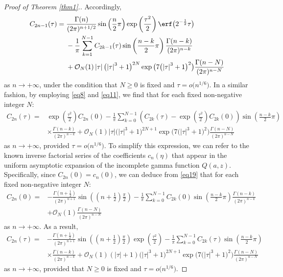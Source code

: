 \begin{proof}[Proof of Theorem \ref{thm1}.]
Accordingly,
\begin{align}
C_{2n - 1} (\tau ) ={}& \frac{\Gamma (n)}{(2\pi )^{n + 1/2} }\sin \left( \frac{n}{2}\pi \right)\exp \left( \frac{\tau ^2}{2} \right)\erf\big( 2^{ - \frac{1}{2}} \tau \big)\nonumber\\
& - \frac{1}{\pi}\sum_{k = 1}^{N - 1} C_{2k - 1} (\tau )\sin \left( \frac{n - k}{2}\pi \right)\frac{\Gamma (n - k)}{(2\pi )^{n - k} }\nonumber
\\ & +\mathcal{O}_N (1)\left| \tau \right|\bigl(\left| \tau \right|^3 + 1\bigr)^{2N} \exp \big( 7\bigl(\left| \tau \right|^3 + 1\bigr)^2 \big) \frac{\Gamma (n - N)}{(2\pi )^{n - N}}\label{eq12}
\end{align}
as $n\to+\infty$, under the condition that $N\ge 0$ is fixed and $\tau = o\big(n^{1/6}\big)$. In a similar fashion, by employing \eqref{eq8} and \eqref{eq11}, we find that for each fixed non-negative integer $N$:
\begin{align*}
C_{2n} (\tau ) ={}& \exp \left( \frac{\tau ^2}{2} \right)C_{2n} (0) - \frac{1}{\pi}\sum_{k = 0}^{N - 1} \left( C_{2k} (\tau ) - \exp \left( \frac{\tau ^2}{2} \right)C_{2k} (0) \right)\sin \left( \frac{n - k}{2}\pi \right)
\\ &\times\frac{\Gamma (n - k)}{(2\pi )^{n - k}} + \mathcal{O}_N (1)\left| \tau \right|\bigl(\left| \tau \right|^3 + 1\bigr)^{2N + 1} \exp \big( 7\bigl(\left| \tau \right|^3 + 1\bigr)^2 \big)\frac{\Gamma (n - N)}{(2\pi )^{n - N}}
\end{align*}
as $n\to+\infty$, provided $\tau = o\big(n^{1/6}\big)$. To simplify this expression, we can refer to the known inverse factorial series of the coefficients $c_n(\eta)$ that appear in the uniform asymptotic expansion of the incomplete gamma function $Q(a,z)$. Specifically, since $C_{2n}(0)=c_n(0)$, we can deduce from \eqref{eq19} that for each fixed non-negative integer $N$:
\begin{align*}
C_{2n} (0) ={}& - \frac{\Gamma \left( n + \frac{1}{2} \right)}{(2\pi )^{n + 1}}\sin \left( \left(n + \frac{1}{2}\right)\frac{\pi}{2} \right) - \frac{1}{\pi }\sum_{k = 0}^{N - 1} C_{2k} (0)\sin \left( \frac{n - k}{2}\pi \right)\frac{\Gamma (n - k)}{(2\pi )^{n - k}} \\ & + \mathcal{O}_N(1)\frac{\Gamma (n - N)}{(2\pi )^{n - N} }
\end{align*}
as $n\to+\infty$. As a result,
\begin{align}
C_{2n} (\tau ) ={}& -\frac{\Gamma \left( n + \frac{1}{2} \right)}{(2\pi )^{n + 1} }\sin \left( \left( n + \frac{1}{2} \right)\frac{\pi }{2} \right)\exp \left( \frac{\tau ^2}{2} \right) - \frac{1}{\pi }\sum\limits_{k = 0}^{N-1} C_{2k} (\tau )\sin \left( \frac{n - k}{2}\pi \right)\nonumber
\\ &\times\frac{\Gamma (n - k)}{(2\pi )^{n - k} } + \mathcal{O}_N (1)(\left| \tau \right|+1)\bigl(\left| \tau \right|^3 + 1\bigr)^{2N + 1} \exp \big( 7\bigl(\left| \tau \right|^3 + 1\bigr)^2 \big)\frac{\Gamma (n - N)}{(2\pi )^{n - N}}\label{eq13}
\end{align}
as $n\to+\infty$, provided that $N\ge 0$ is fixed and $\tau = o\big(n^{1/6}\big)$.


\end{proof}
